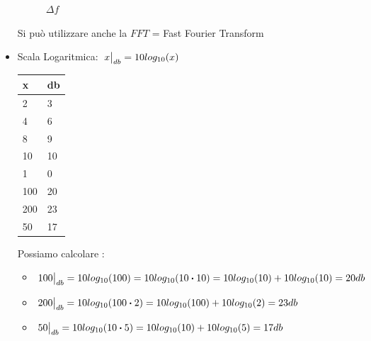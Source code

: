 \begin{itemize}
{\begin{figure}[H]
                    \caption{ $\Delta f$}
                    \label{fig:campionamento MATLAB sinc}
                \end{figure}
                Si può utilizzare anche la $FFT$ = Fast Fourier Transform
            }
            \item{
                Scala Logaritmica: $\eval*{x}_{db}= 10log_{10}(x)$
                \begin{table}[H]
                    \centering
                    \begin{tabular}{l|l}
                        x   & db  \\ 
                        \hline
                        2   & 3   \\
                        4   & 6   \\
                        8   & 9   \\
                        10  & 10  \\
                        1   & 0   \\
                        100 & 20  \\
                        200 & 23  \\
                        50  & 17 
                    \end{tabular}
                \end{table}
                Possiamo calcolare :
                \begin{itemize}
                    \item $\eval*{100}_{db} = 10log_{10}(100) =10log_{10}(10\dotproduct 10) = 10log_{10}(10)+10log_{10}(10) = 20db $
                    \item $\eval*{200}_{db} = 10log_{10}(100\dotproduct 2) = 10log_{10}(100)+10log_{10}(2) = 23db $
                    \item $\eval*{50}_{db} = 10log_{10}(10\dotproduct 5) = 10log_{10}(10)+10log_{10}(5) = 17db $
                \end{itemize}
            }
        \end{itemize}

